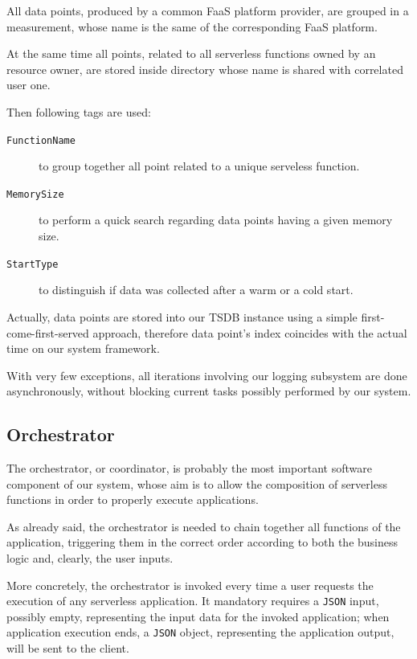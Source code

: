 \documentclass[12pt,a4paper]{report}
\begin{document}
All data points, produced by a common FaaS platform provider, are grouped in a measurement, whose name is the same of the corresponding FaaS platform. 

At the same time all points, related to all serverless functions owned by an resource owner, are stored inside directory whose name is shared with correlated user one.

Then following tags are used: 

\begin{description}
	\item[\texttt{FunctionName}] to group together all point related to a unique serveless function. 
	\item[\texttt{MemorySize}] to perform a quick search regarding data points having a given memory size.
	\item[\texttt{StartType}] to distinguish if data was collected after a warm or a cold start.
\end{description}

Actually, data points are stored into our TSDB instance using a simple first-come-first-served approach, therefore data point's index coincides with the actual time on our system framework. 

With very few exceptions, all iterations involving our logging subsystem are done asynchronously, without blocking current tasks possibly performed by our system.  

\subsection{Orchestrator}
	
The orchestrator, or coordinator, is probably the most important software component of our system, whose aim is to allow the composition of serverless functions in order to properly execute applications.

As already said, the orchestrator is needed to chain together all functions of the application, triggering them in the correct order according to both the business logic and, clearly, the user inputs.

More concretely, the orchestrator is invoked every time a user requests the execution of any serverless application. It mandatory requires a \texttt{JSON} input, possibly empty, representing the input data for the invoked application; when application execution ends, a \texttt{JSON} object, representing the application output, will be sent to the client.
\end{document}

